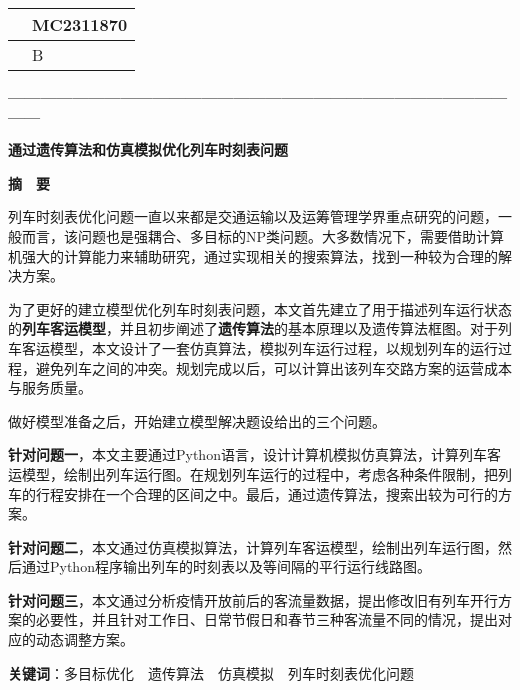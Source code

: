 \thispagestyle{empty}   %

\begin{table}[h]
    \centering
    \renewcommand\arraystretch{2}
    \begin{tabular}{|l|l|}
    \hline
    \quad & MC2311870\quad \\ \hline
       & B         \\ \hline
    \end{tabular}
\end{table}



\begin{center}
    \textbf{—————————————————————————————————}

    \textbf{\fontsize{20}{1.5}通过遗传算法和仿真模拟优化列车时刻表问题}

    \textbf{摘　要}
\end{center}





%
%

列车时刻表优化问题一直以来都是交通运输以及运筹管理学界重点研究的问题，一般而言，该问题也是强耦合、多目标的NP类问题。大多数情况下，需要借助计算机强大的计算能力来辅助研究，通过实现相关的搜索算法，找到一种较为合理的解决方案\cite{niuGuidaoliecheshikebiaowentiyanjiuzongshu2021}。

为了更好的建立模型优化列车时刻表问题，本文首先建立了用于描述列车运行状态的\textbf{列车客运模型}，并且初步阐述了\textbf{遗传算法}的基本原理以及遗传算法框图。对于列车客运模型，本文设计了一套仿真算法，模拟列车运行过程，以规划列车的运行过程，避免列车之间的冲突。规划完成以后，可以计算出该列车交路方案的运营成本与服务质量。

做好模型准备之后，开始建立模型解决题设给出的三个问题。

\textbf{针对问题一}，本文主要通过Python语言，设计计算机模拟仿真算法，计算列车客运模型，绘制出列车运行图。在规划列车运行的过程中，考虑各种条件限制，把列车的行程安排在一个合理的区间之中。最后，通过遗传算法，搜索出较为可行的方案。

\textbf{针对问题二}，本文通过仿真模拟算法，计算列车客运模型，绘制出列车运行图，然后通过Python程序输出列车的时刻表以及等间隔的平行运行线路图。

\textbf{针对问题三}，本文通过分析疫情开放前后的客流量数据，提出修改旧有列车开行方案的必要性，并且针对工作日、日常节假日和春节三种客流量不同的情况，提出对应的动态调整方案。\newline

\textbf{关键词}：多目标优化　遗传算法　仿真模拟　列车时刻表优化问题




%
%

\newpage
\tableofcontents
\thispagestyle{empty}